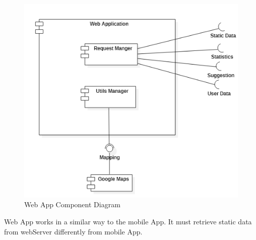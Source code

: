 \begin{figure}[H]
\centering
\includegraphics{Images/WebAppComponent.png}
\caption{\label{fig:ComWI}Web App Component Diagram}
\end{figure}
Web App works in a similar way to the mobile App. It must retrieve static data from webServer differently from mobile App.
